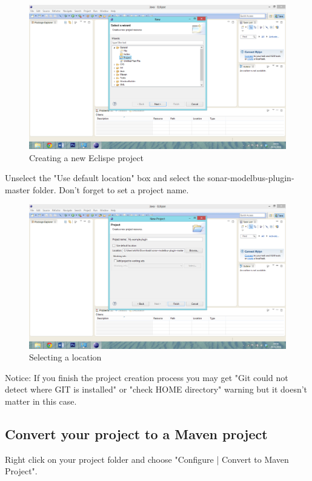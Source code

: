 \begin{figure}
	\centering
		\includegraphics[width=\textwidth]{neweclipseproject}
	\caption{Creating a new Eclispe project}
	\label{fig:neweclipseproject}
\end{figure}

Unselect the "Use default location" box and select the sonar-modelbus-plugin-master folder. Don't forget to set a project name.
 
\begin{figure}
	\centering
		\includegraphics[width=\textwidth]{selectlocation}
	\caption{Selecting a location}
	\label{fig:selectlocation}
\end{figure}

Notice: If you finish the project creation process you may get
"Git could not detect where GIT is installed" or "check HOME directory" warning but it doesn't matter in this case.



\subsection{Convert your project to a Maven project}
Right click on your project folder and choose "Configure | Convert to Maven Project".
 
